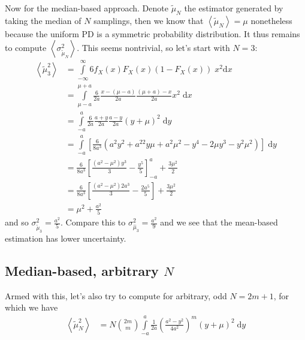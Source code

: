 \documentclass[12pt]{report}
\newcommand*{\ev}[1]{\left\langle#1\right\rangle}
\begin{document}
Now for the median-based approach. Denote $\tilde{\mu}_N$ the estimator
generated by taking the median of $N$ samplings, then we know that
$\ev{\tilde{\mu}_N} = \mu$ nonetheless because the uniform PD is a
symmetric probability distribution. It thus remains to compute
$\ev{\sigma^2_{\tilde{\mu}_N}}$. This seems nontrivial, so let's start
with $N=3$:
\begin{align}
    \ev{\tilde{\mu}_3^2} &= \int\limits_{-\infty}^{\infty}
        6f_X(x)F_X(x)\left( 1 - F_X(x) \right)\;x^2 \mathrm{d}x\\
        &= \int\limits_{\mu-a}^{\mu+a}
            \frac{6}{2a}\frac{x - (\mu - a)}{2a}\frac{(\mu + a) - x}{2a}x^2
            \;\mathrm{d}x\\
        &= \int\limits_{-a}^{a}\frac{6}{2a}\frac{a + y}{2a}\frac{a - y}{2a}
            (y + \mu)^2\;\mathrm{d}y\\
        &= \int\limits_{-a}^a\left[
                \frac{6}{8a^3}\left(
                    a^2y^2 + a^22y\mu + a^2\mu^2 - y^4 - 2\mu y^3 - y^2\mu^2
                \right)
            \right]\;\mathrm{d}y\\
        &= \frac{6}{8a^3}\left[
                \frac{(a^2 - \mu^2)y^3}{3} - \frac{y^5}{5}
            \right]_{-a}^a + \frac{3\mu^2}{2}\\
        &= \frac{6}{8a^3}\left[
            \frac{\left(
                a^2 - \mu^2
            \right) 2a^3}{3} - \frac{2a^5}{5}
        \right] + \frac{3\mu^2}{2}\\
        &= \mu^2 + \frac{a^2}{5}
\end{align}
and so $\sigma_{\tilde{\mu}_3}^2 = \frac{a^2}{5}$. Compare this to
$\sigma_{\hat{\mu}_3}^2 = \frac{a^2}{9}$ and we see that the mean-based
estimation has lower uncertainty.

\subsection{Median-based, arbitrary $N$}

Armed with this, let's also try to compute for arbitrary, odd $N=2m+1$, for which we
have
\begin{align}
    \ev{\tilde{\mu}_N^2}
        &=
            N\binom{2m}{m}\int\limits_{-a}^{a}\frac{1}{2a}
                \left( \frac{a^2 - y^2}{4a^2} \right)^m(y+\mu)^2
            \;\mathrm{d}y
\end{align}
\end{document}
